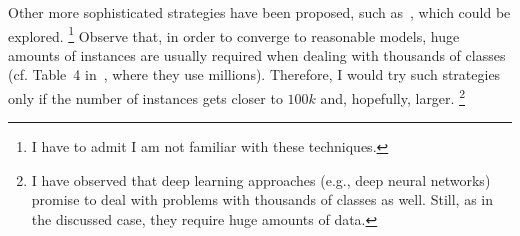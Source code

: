 \documentclass[11pt]{article}
\begin{document}
Other more sophisticated strategies have been proposed, such 
as~\cite{JMLR:v15:gupta14a}, which could be explored.%
\footnote{I have to admit I am not familiar with these techniques.}
Observe that, in order to converge to reasonable models, huge amounts of 
instances are usually required when dealing with thousands of classes (cf. 
Table~4 in~\cite{JMLR:v15:gupta14a}, where they use millions). Therefore, I 
would try such strategies only if the number of instances gets closer to 
$100k$ and, hopefully, larger.%
\footnote{I have observed that deep learning approaches (e.g., deep 
neural networks) promise to deal with problems with thousands of classes as 
well. Still, as in the discussed case, they require huge amounts of 
data.}

%
% 

%
%
\end{document}
